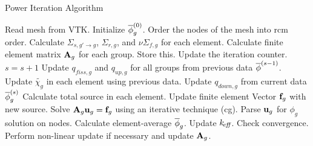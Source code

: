 \begin{frame}{Power Iteration Algorithm}

    \begin{algorithm}[H]
      \caption{\scriptsize General Iteration Scheme}
      \label{algorithm:general}
      \begin{algorithmic}[1]
      \State Read mesh from VTK.
      \State Initialize $\overline{\phi}_g^{(0)}$.
      \State Order the nodes of the mesh into \gls{rcm} order.
        \label{state:rcm}
      \State Calculate $\Sigma_{s,g'\rightarrow g}$, $\Sigma_{r,g}$, and 
        $\nu \Sigma_{f,g}$ for each element.
      \State Calculate finite element matrix $\mathbf{A}_g$ for each group. Store this. 
        \label{state:fem_matrix}
        \State Update the iteration counter. $s=s+1$
        \State Update $q_{fiss,g}$ and $q_{up,g}$ for all groups from previous 
          data $\overline{\phi}^{(s-1)}$.
        \State Update $\widetilde{\chi_g}$ in each element using previous data.
          \label{state:chi_collapse}
          \State Update $q_{down,g}$ from current data $\overline{\phi}_g^{(s)}$
          \State Calculate total source in each element.
          \State Update finite element Vector $\mathbf{f}_g$ with new source.
            \label{state:fem_vector}
          \State Solve $\mathbf{A}_g \mathbf{u}_g = \mathbf{f}_g$ using an iterative technique
            (\gls{cg}).
          \State Parse $\mathbf{u}_g$ for $\phi_g$ solution on nodes.
          \State Calculate element-average $\overline{\phi}_g$.
        \EndFor
        \State Update $k_{\!\mbox{\scriptsize \em eff}}$.
        \State Check convergence.
        \State Perform non-linear update if necessary and update $\mathbf{A}_g$. 
          \label{state:nonlinear}
      \EndWhile
      \end{algorithmic}
    \end{algorithm}

\end{frame}
